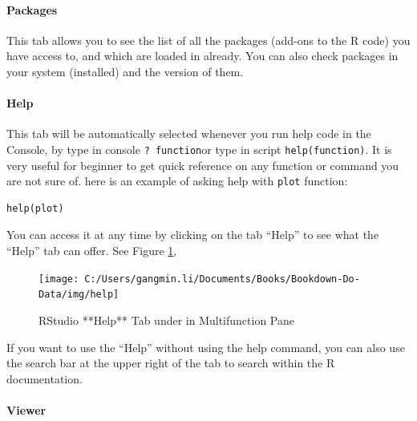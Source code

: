 \documentclass[
]{book}
\begin{document}
\hypertarget{packages}{%
\paragraph{\texorpdfstring{\textbf{Packages}}{Packages}}\label{packages}}

This tab allows you to see the list of all the packages (add-ons to the R code) you have access to, and which are loaded in already. You can also check packages in your system (installed) and the version of them.

\hypertarget{help}{%
\paragraph{\texorpdfstring{\textbf{Help}}{Help}}\label{help}}

This tab will be automatically selected whenever you run help code in the Console, by type in console \texttt{?\ function}or type in script \texttt{help(function)}. It is very useful for beginner to get quick reference on any function or command you are not sure of. here is an example of asking help with \texttt{plot} function:

\begin{verbatim}
help(plot)
\end{verbatim}

You can access it at any time by clicking on the tab ``Help'' to see what the ``Help'' tab can offer. See Figure \ref{fig:help},

\begin{figure}

{\centering \texttt{[image: C:/Users/gangmin.li/Documents/Books/Bookdown-Do-Data/img/help]} 

}

\caption{RStudio **Help** Tab under in Multifunction Pane}\label{fig:help}
\end{figure}

If you want to use the ``Help'' without using the help command, you can also use the search bar at the upper right of the tab to search within the R documentation.

\hypertarget{viewer}{%
\paragraph{\texorpdfstring{\textbf{Viewer}}{Viewer}}\label{viewer}}
\end{document}
